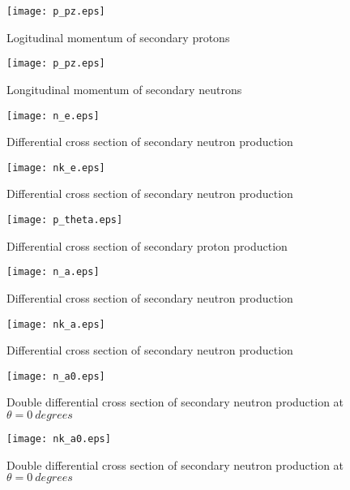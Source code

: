 \documentclass[12pt]{article}
\begin{document}
\newpage

\begin{figure}[htbp]
\caption{Logitudinal momentum of secondary protons}
\label{fig5}  
\centerline{\texttt{[image: p\_pz.eps]}}
\end{figure}
\begin{figure}[htbp]
\caption{Longitudinal momentum of secondary neutrons}
\label{fig6} 
\centerline{\texttt{[image: p\_pz.eps]}}
\end{figure}

\newpage

\begin{figure}[htbp]
\caption{Differential cross section of secondary neutron production}
\label{fig7}  
\centerline{\texttt{[image: n\_e.eps]}}
\end{figure}
\begin{figure}[htbp]
\caption{Differential cross section of secondary neutron production}
\label{fig8}  
\centerline{\texttt{[image: nk\_e.eps]}}
\end{figure}
\begin{figure}[htbp]
\caption{Differential cross section of secondary proton production}
\label{fig9} 
\centerline{\texttt{[image: p\_theta.eps]}}
\end{figure}
\begin{figure}[htbp]
\caption{Differential cross section of secondary neutron production}
\label{fig10} 
\centerline{\texttt{[image: n\_a.eps]}}
\end{figure}
\begin{figure}[htbp]
\caption{Differential cross section of secondary neutron production}
\label{fig10a} 
\centerline{\texttt{[image: nk\_a.eps]}}
\end{figure}

\clearpage


\begin{figure}[htbp]
\caption{Double differential cross section of secondary neutron production at $\theta = 0~degrees$}
\label{figa0} 
\centerline{\texttt{[image: n\_a0.eps]}}
\end{figure}

\begin{figure}[htbp]
\caption{Double differential cross section of secondary neutron production at $\theta = 0~degrees$}
\label{figa0a} 
\centerline{\texttt{[image: nk\_a0.eps]}}
\end{figure}
\end{document}
